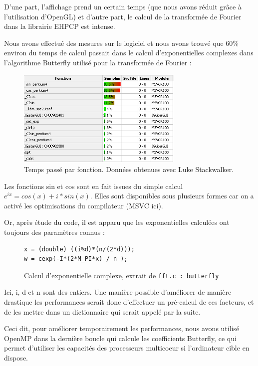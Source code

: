 \documentclass[a4paper,11pt]{article}
\begin{document}
D'une part, l'affichage prend un certain temps (que nous avons réduit grâce à l'utilisation d'OpenGL)
et d'autre part, le calcul de la transformée de Fourier dans la librairie EHPCP est intense.

Nous avons effectué des mesures sur le logiciel et nous avons trouvé que 60\% environ du temps de calcul
passait dans le calcul d'exponentielles complexes dans l'algorithme Butterfly utilisé pour la transformée de Fourier :

\begin{figure}[H]
\begin{center}
\includegraphics[width=300px]{sincos.png}
\caption{Temps passé par fonction. Données obtenues avec Luke Stackwalker.}
\label{player_performance}
\end{center}
\end{figure}

Les fonctions sin et cos sont en fait issues du simple calcul $e^{ix} = cos(x) + i*sin(x)$.
Elles sont disponibles sous plusieurs formes car on a activé les optimisations du compilateur (MSVC ici).

Or, après étude du code, il est apparu que les exponentielles calculées ont toujours des paramètres connus :
\begin{figure}[H]
\begin{lstlisting}
x = (double) ((i%d)*(n/(2*d)));
w = cexp(-I*(2*M_PI*x) / n );
\end{lstlisting}
\caption{Calcul d'exponentielle complexe, extrait de \texttt{fft.c : butterfly}}
\label{api_cexp}
\end{figure}

Ici, i, d et n sont des entiers. Une manière possible d'améliorer de manière drastique les performances serait donc d'effectuer
un pré-calcul de ces facteurs, et de les mettre dans un dictionnaire qui serait appelé par la suite.

Ceci dit, pour améliorer temporairement les performances, nous avons utilisé OpenMP dans la dernière boucle qui calcule
les coefficients Butterfly, ce qui permet d'utiliser les capacités des processeurs multicoeur si l'ordinateur cible en dispose.
\clearpage
\end{document}
